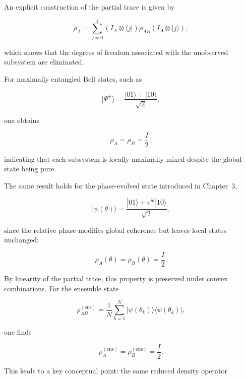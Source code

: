\medskip

An explicit construction of the partial trace is given by

\begin{equation}
\rho_A
=
\sum_{j=0}^{1}
(I_A \otimes \langle j|)
\rho_{AB}
(I_A \otimes |j\rangle),
\label{eq:partial_trace_explicit_A}
\end{equation}

which shows that the degrees of freedom associated with the unobserved subsystem are eliminated.

\medskip

For maximally entangled Bell states, such as

\[
|\Psi^+\rangle
=
\frac{|01\rangle + |10\rangle}{\sqrt{2}},
\]

one obtains

\begin{equation}
\rho_A
=
\rho_B
=
\frac{I}{2},
\label{eq:bell_reduced_maximally_mixed}
\end{equation}

indicating that each subsystem is locally maximally mixed despite the global state being pure.

\medskip

The same result holds for the phase-evolved state introduced in Chapter~3,

\[
|\psi(\theta)\rangle
=
\frac{|01\rangle + e^{i\theta}|10\rangle}{\sqrt{2}},
\]

since the relative phase modifies global coherence but leaves local states unchanged:

\begin{equation}
\rho_A(\theta)
=
\rho_B(\theta)
=
\frac{I}{2}.
\label{eq:phase_state_reduced_density}
\end{equation}

\medskip

By linearity of the partial trace, this property is preserved under convex combinations. For the ensemble state

\[
\rho_{AB}^{(\mathrm{ens})}
=
\frac{1}{N}
\sum_{k=1}^{N}
|\psi(\theta_k)\rangle\langle\psi(\theta_k)|,
\]

one finds

\begin{equation}
\rho_A^{(\mathrm{ens})}
=
\rho_B^{(\mathrm{ens})}
=
\frac{I}{2}.
\label{eq:ensemble_reduced_density}
\end{equation}

\medskip

This leads to a key conceptual point: the same reduced density operator

